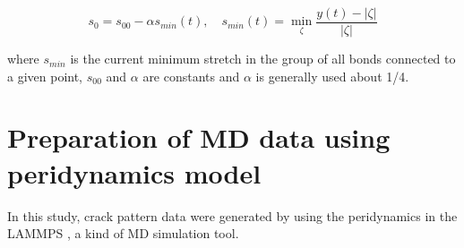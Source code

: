  \begin{equation}
s_0=s_{00}-\alpha s_{min}(t), \quad s_{min}(t)=\min_\zeta{\frac{y(t)-|\zeta|}{|\zeta|}}
\end{equation}

\noindent where $s_{min}$ is the current minimum stretch in the group of all bonds connected to a given point, $s_{00}$ and $\alpha$ are constants and $\alpha$ is generally used about 1/4. 

\section{Preparation of MD data using peridynamics model }
\label{sec:3}

In this study, crack pattern data were generated by using the peridynamics in the LAMMPS \cite{Ref15}, a kind of MD simulation tool.
